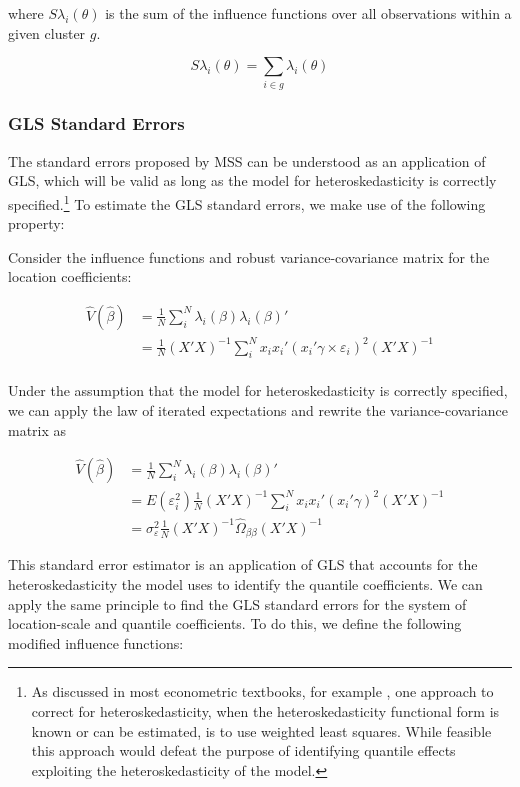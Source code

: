 \documentclass[
  12pt,
  oneside]{article}
\begin{document}
where \(S\lambda_i(\theta)\) is the sum of the influence functions over
all observations within a given cluster \(g\).

\[S\lambda_i(\theta) = \sum_{i\in g} \lambda_i(\theta)
\]

\subsubsection{GLS Standard Errors}\label{sec-gls}

The standard errors proposed by MSS can be understood as an application
of GLS, which will be valid as long as the model for heteroskedasticity
is correctly specified.\footnote{As discussed in most econometric
  textbooks, for example \citet{cameron2005}, one approach to correct
  for heteroskedasticity, when the heteroskedasticity functional form is
  known or can be estimated, is to use weighted least squares. While
  feasible this approach would defeat the purpose of identifying
  quantile effects exploiting the heteroskedasticity of the model.} To
estimate the GLS standard errors, we make use of the following property:

Consider the influence functions and robust variance-covariance matrix
for the location coefficients:

\[\begin{aligned}
\hat V(\hat \beta) &= \frac{1}{N} \sum_i^N \lambda_{i}(\beta) \lambda_{i}(\beta)' \\
&= \frac{1}{N}  (X'X)^{-1}  \sum_i^N x_i x_i' ( x_i'\gamma \times \varepsilon_i)^2 (X'X)^{-1} \\
\end{aligned}
\]

Under the assumption that the model for heteroskedasticity is correctly
specified, we can apply the law of iterated expectations and rewrite the
variance-covariance matrix as

\[\begin{aligned}
\hat V(\hat \beta) &= \frac{1}{N} \sum_i^N \lambda_{i}(\beta) \lambda_{i}(\beta)' \\
&= E(\varepsilon_i^2) \frac{1}{N}  (X'X)^{-1}  \sum_i^N x_i x_i' ( x_i'\gamma)^2 (X'X)^{-1} \\
&= \sigma^2_{\varepsilon} \frac{1}{N}  (X'X)^{-1}  \hat\Omega_{\beta\beta} (X'X)^{-1}  
\end{aligned}
\]

This standard error estimator is an application of GLS that accounts for
the heteroskedasticity the model uses to identify the quantile
coefficients. We can apply the same principle to find the GLS standard
errors for the system of location-scale and quantile coefficients. To do
this, we define the following modified influence functions:
\end{document}
